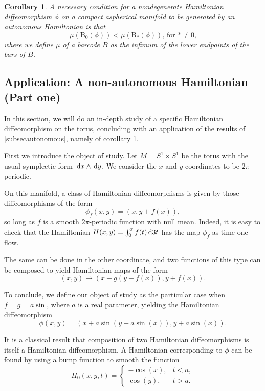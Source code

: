 \documentclass{article}
\newtheorem{corollary}{Corollary}
\theoremstyle{nonumberplain}
\newcommand{\BB}{\mathrm{B}}
\begin{document}
\begin{corollary}\label{corautonomous}
A necessary condition for a nondegenerate Hamiltonian diffeomorphism $\phi$ on a compact aspherical manifold to be generated by an autonomous Hamiltonian is that
\begin{equation}
\mu(\BB_0(\phi)) < \mu(\BB_*(\phi))\text{, for $* \neq 0$,}
\end{equation}
where we define $\mu$ of a barcode $B$ as the infimum of the lower endpoints of the bars of $B$.
\end{corollary}

\subsection{Application: A non-autonomous Hamiltonian (Part one)}

In this section, we will do an in-depth study of a specific Hamiltonian diffeomorphism on the torus, concluding with an application of the results of \ref{subsecautonomous}, namely of corollary \ref{corautonomous}.

First we introduce the object of study. Let $M = S^1 \times S^1$ be the torus with the usual symplectic form $\dl x \wedge \dl y$. We consider the $x$ and $y$ coordinates to be $2\pi$-periodic.

On this manifold, a class of Hamiltonian diffeomorphisms is given by those diffeomorphisms of the form
\begin{equation}
\phi_f(x,y) = (x, y + f(x)),
\end{equation}
so long as $f$ is a smooth $2\pi$-periodic function with null mean. Indeed, it is easy to check that the Hamiltonian $H(x,y) = \int_0^x f(t) \dl3 t$ has the map $\phi_f$ as time-one flow.

The same can be done in the other coordinate, and two functions of this type can be composed to yield Hamiltonian maps of the form
\begin{equation}
(x,y) \mapsto (x + g(y+f(x)), y+f(x)).
\end{equation}

To conclude, we define our object of study as the particular case when $f = g = a \sin$, where $a$ is a real parameter, yielding the Hamiltonian diffeomorphism
\[\phi(x,y) = ( x + a \sin(y + a \sin(x)), y + a \sin(x)).\]

It is a classical result that composition of two Hamiltonian diffeomorphisms is itself a Hamiltonian diffeomorphism. A Hamiltonian corresponding to $\phi$ can be found by using a bump function to smooth the function
\begin{equation}
H_0(x,y,t) = \begin{cases}
-\cos(x), & t < a,\\
\cos(y), & t > a.
\end{cases}
\end{equation}
\end{document}
